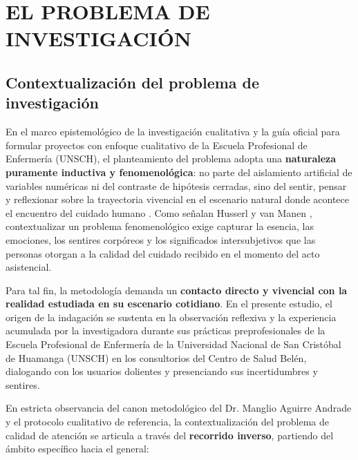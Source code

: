 \section{EL PROBLEMA DE INVESTIGACIÓN}
\label{sec:cap1_problema}

\subsection{Contextualización del problema de investigación}
\label{sec:1.1_contextualizacion_problema}

En el marco epistemológico de la investigación cualitativa y la guía oficial para formular proyectos con enfoque cualitativo de la Escuela Profesional de Enfermería (UNSCH), el planteamiento del problema adopta una \textbf{naturaleza puramente inductiva y fenomenológica}: no parte del aislamiento artificial de variables numéricas ni del contraste de hipótesis cerradas, sino del sentir, pensar y reflexionar sobre la trayectoria vivencial en el escenario natural donde acontece el encuentro del cuidado humano \cite{sampieri2018}. Como señalan Husserl \cite{husserl1949} y van Manen \cite{vanmanen1990}, contextualizar un problema fenomenológico exige capturar la esencia, las emociones, los sentires corpóreos y los significados intersubjetivos que las personas otorgan a la calidad del cuidado recibido en el momento del acto asistencial.

Para tal fin, la metodología demanda un \textbf{contacto directo y vivencial con la realidad estudiada en su escenario cotidiano}. En el presente estudio, el origen de la indagación se sustenta en la observación reflexiva y la experiencia acumulada por la investigadora durante sus prácticas preprofesionales de la Escuela Profesional de Enfermería de la Universidad Nacional de San Cristóbal de Huamanga (UNSCH) en los consultorios del Centro de Salud Belén, dialogando con los usuarios dolientes y presenciando sus incertidumbres y sentires.

En estricta observancia del canon metodológico del Dr. Manglio Aguirre Andrade y el protocolo cualitativo de referencia, la contextualización del problema de calidad de atención se articula a través del \textbf{recorrido inverso}, partiendo del ámbito específico hacia el general:

